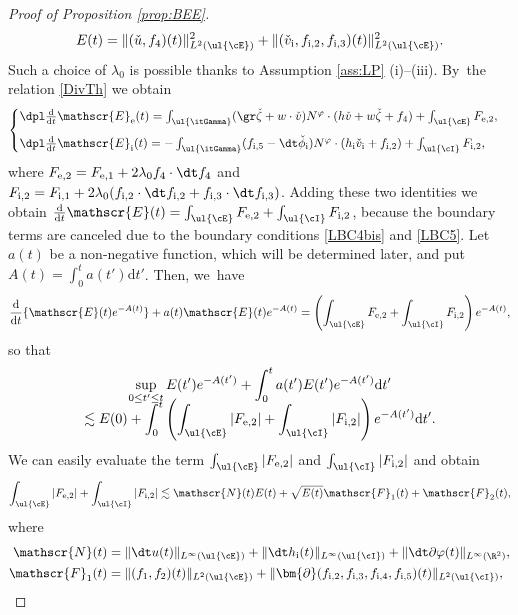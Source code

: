 \begin{proof}[Proof of Proposition \ref{prop:BEE}]
\[
E(t)=\|(\check{u},f_4)(t)\|_{L^2(\ul{\cE})}^2+\|(\check{v}_\mathrm{i},f_{{\rm i},2},f_{{\rm i},3})(t)\|_{L^2(\ul{\cE})}^2.
\]
Such a choice of $\lambda_0$ is possible thanks to Assumption \ref{ass:LP} (i)--(iii). By~the relation \eqref{DivTh} we obtain
\begin{equation}\label{BEI}
\begin{cases}
\dpl\frac{\rm d}{{\rm d}t}\mathscr{E}_\mathrm{e}(t) = \int_{\ul{\itGamma}}(\gr\check{\zeta}+w\cdot\check{v})N^\varphi\cdot(h\check{v}+w\check{\zeta}+f_4)
+ \int_{\ul{\cE}}F_{{\rm e},2}, \\[8pt]
\dpl\frac{\rm d}{{\rm d}t}\mathscr{E}_\mathrm{i}(t) = -\int_{\ul{\itGamma}}(f_{{\rm i},5}-\dt\check{\phi}_\mathrm{i})N^\varphi\cdot(h_\mathrm{i}\check{v}_\mathrm{i}+f_{{\rm i},2})
+ \int_{\ul{\cI}}F_{{\rm i},2},
\end{cases}
\end{equation}
where $F_{{\rm e},2}=F_{{\rm e},1}+2\lambda_0f_4\cdot\dt f_4$ and
$F_{{\rm i},2}=F_{{\rm i},1}+2\lambda_0(f_{{\rm i},2}\cdot\dt f_{{\rm i},2} + f_{{\rm i},3}\cdot\dt f_{{\rm i},3})$.
Adding these two identities we obtain $\frac{\rm d}{{\rm d}t}\mathscr{E}(t)=\int_{\ul{\cE}}F_{{\rm e},2}+\int_{\ul{\cI}}F_{{\rm i},2}$,
because the boundary terms are canceled due to the boundary conditions \eqref{LBC4bis} and \eqref{LBC5}.
Let $a(t)$ be a non-negative function, which will be determined later, and put $A(t)=\int_0^t a(t')\mathrm{d}t'$.
Then, we~have
\[
\frac{\rm d}{{\rm d}t}\{ \mathscr{E}(t)e^{-A(t)} \} + a(t)\mathscr{E}(t)e^{-A(t)}
= \left(\int_{\ul{\cE}}F_{{\rm e},2}+\int_{\ul{\cI}}F_{{\rm i},2} \right) e^{-A(t)},
\]
so that
\begin{multline*}
\sup_{0\leq t'\leq t}E(t')e^{-A(t')} +\int_0^t a(t')E(t')e^{-A(t')}{\rm d}t' \\[-8pt]
\lesssim E(0) + \int_0^t \left(\int_{\ul{\cE}}|F_{{\rm e},2}|+\int_{\ul{\cI}}|F_{{\rm i},2}| \right) e^{-A(t')} {\rm d}t'.
\end{multline*}
We can easily evaluate the term $\int_{\ul{\cE}}|F_{{\rm e},2}|$ and $\int_{\ul{\cI}}|F_{{\rm i},2}|$ and obtain
\[
\int_{\ul{\cE}}|F_{{\rm e},2}|+\int_{\ul{\cI}}|F_{{\rm i},2}|
\lesssim \mathscr{N}(t)E(t)+\sqrt{E(t)}\mathscr{F}_1(t)+\mathscr{F}_2(t),
\]
where
\begin{align*}
\mathscr{N}(t)
&= \|\dt u(t)\|_{L^\infty(\ul{\cE})}+\|\dt h_\mathrm{i}(t)\|_{L^\infty(\ul{\cI})}+\|\dt\partial\varphi(t)\|_{L^\infty(\R^2)}, \\
\mathscr{F}_1(t)
&= \|(f_1,f_2)(t)\|_{L^2(\ul{\cE})} + \|\bm{\partial}(f_{{\rm i},2},f_{{\rm i},3},f_{{\rm i},4},f_{{\rm i},5})(t)\|_{L^2(\ul{\cI})}, \\

\end{align*}
\end{proof}
